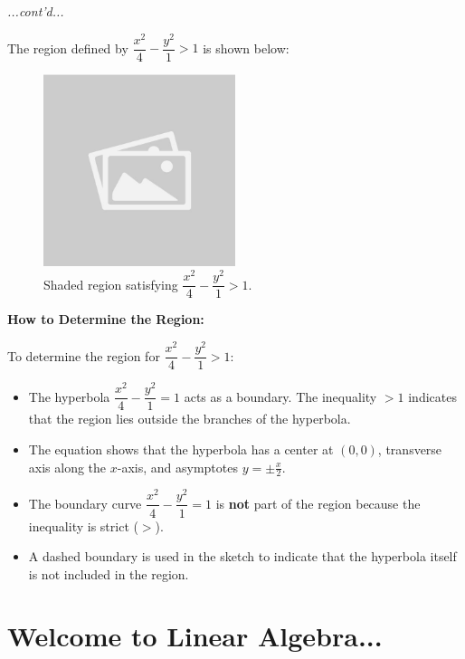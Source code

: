 \documentclass{article}
\begin{document}
\begin{examplebox}
\textit{...cont'd...}
\begin{solutionbox}
    The region defined by \( \dfrac{x^2}{4} - \dfrac{y^2}{1} > 1 \) is shown below:
    
    \begin{figure}[H]
        \centering
        \includegraphics[width=0.5\textwidth]{sample_image.jpg}
        \caption{Shaded region satisfying \( \dfrac{x^2}{4} - \dfrac{y^2}{1} > 1 \).}
        \label{fig:hyperbola_region}
    \end{figure}

    \textbf{How to Determine the Region:}
    \begin{conceptbox}
    To determine the region for \( \dfrac{x^2}{4} - \dfrac{y^2}{1} > 1 \):
    \begin{itemize}
        \item The hyperbola \( \dfrac{x^2}{4} - \dfrac{y^2}{1} = 1 \) acts as a boundary. The inequality \( > 1 \) indicates that the region lies outside the branches of the hyperbola.
        \item The equation shows that the hyperbola has a center at \( (0,0) \), transverse axis along the \( x \)-axis, and asymptotes \( y = \pm \frac{x}{2} \).
        \item The boundary curve \( \dfrac{x^2}{4} - \dfrac{y^2}{1} = 1 \) is \textbf{not} part of the region because the inequality is strict (\( > \)).
        \item A dashed boundary is used in the sketch to indicate that the hyperbola itself is not included in the region.
    \end{itemize}
    \end{conceptbox}
\end{solutionbox}    
\end{examplebox}

\section*{Welcome to Linear Algebra...}
\end{document}
